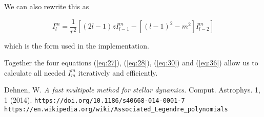 \documentclass{article}
\begin{document}
We can also rewrite this as

\begin{equation} \label{eq:36}
\boxed{I^m_l = \frac{1}{r^2} \left[ (2l-1) z I^m_{l-1} - \left[(l-1)^2-m^2\right] I^m_{l-2} \right]}
\end{equation}

which is the form used in the implementation.

Together the four equations (\ref{eq:27}), (\ref{eq:28}), (\ref{eq:30}) and (\ref{eq:36}) allow us to calculate all needed $I^m_m$ iteratively and efficiently.


\begin{thebibliography}{9}
 Dehnen, W. \textit{A fast multipole method for stellar dynamics.} Comput. Astrophys. 1, 1 (2014). \texttt{https://doi.org/10.1186/s40668-014-0001-7}
 \texttt{https://en.wikipedia.org/wiki/Associated\_Legendre\_polynomials}  
\end{thebibliography}
\end{document}

